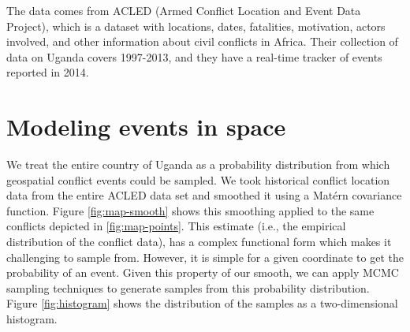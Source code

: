 \documentclass[a0,final]{a0poster}
\begin{document}
\begin{multicols}{3}
\noindent The data comes from ACLED (Armed Conflict Location and Event Data Project), which is a dataset with locations, dates, fatalities, motivation, actors involved, and other information about civil conflicts in Africa. Their collection of data on Uganda covers 1997-2013, and they have a real-time tracker of events reported in 2014.\cite{ACLED}

\vspace{-6mm}

\section*{Modeling events in space}

\vspace{-6mm}

We treat the entire country of Uganda as a probability distribution from which geospatial conflict events could be sampled.  We took historical conflict location data from the entire ACLED data set and smoothed it using a Mat\'{e}rn covariance function.  Figure \ref{fig:map-smooth} shows this smoothing applied to the same conflicts depicted in \ref{fig:map-points}. This estimate (i.e., the empirical distribution of the conflict data), has a complex functional form which makes it challenging to sample from. However, it is simple for a given coordinate to get the probability of an event. Given this property of our smooth, we can apply MCMC sampling techniques to generate samples from this probability distribution. Figure \ref{fig:histogram} shows the distribution of the samples as a two-dimensional histogram.


\end{multicols}
\end{document}
